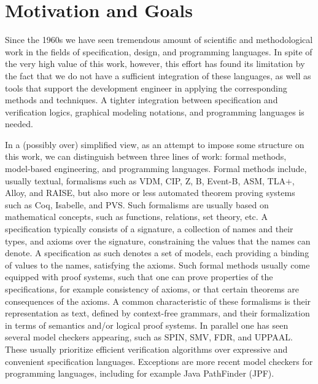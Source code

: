 
\section{Motivation and Goals}
\label{sec:introduction}

Since the 1960s we have seen tremendous amount of scientific and 
methodological work in the fields of specification, design, and 
programming languages. In spite of the very high value of this work, however, this effort has found its limitation by the fact that we do not have a sufficient integration of these languages, as well as tools that support the development engineer in applying the corresponding methods and techniques. A tighter integration between specification and verification logics, graphical modeling notations, and programming languages is needed.

In a (possibly over) simplified view, as an attempt to impose some 
structure on this work, we can distinguish between three lines of 
work: formal methods, model-based engineering, and 
programming languages. Formal methods include, usually textual, 
formalisms such as VDM, CIP, Z, B, Event-B, ASM, TLA+, Alloy, and RAISE, but also more or less 
automated theorem proving systems such as Coq, Isabelle, and 
PVS. Such formalisms are usually based on mathematical 
concepts, such as functions, relations, set theory, etc. A 
specification typically 
consists of a signature, a collection of names and their types, and 
axioms over  the signature, constraining the values that 
the names can denote. A specification as such denotes a set of 
models, each providing a binding of values to the names, satisfying 
the axioms. Such formal methods usually come equipped with proof 
systems, such that one can prove properties of the specifications, 
for example consistency of axioms, or that certain theorems are 
consequences of the axioms. A common characteristic of 
these formalisms is their representation as text, defined by context-free grammars, and their formalization in terms of semantics and/or logical proof systems. 
%
In parallel one has seen several model checkers appearing, such as
SPIN, SMV, FDR, and UPPAAL. These usually prioritize efficient verification algorithms over expressive and convenient 
specification languages. Exceptions are more recent model checkers for programming languages, including for example Java PathFinder (JPF).


